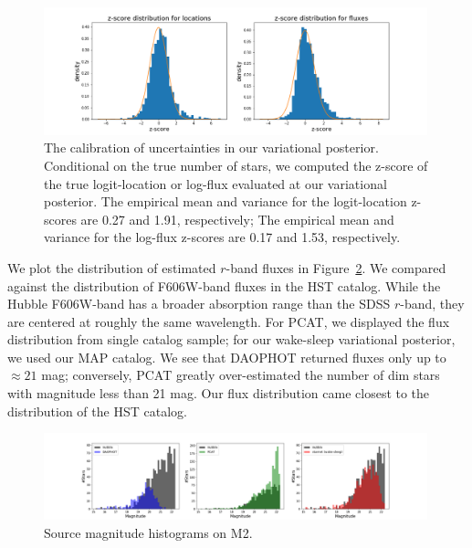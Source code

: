 \begin{figure}[h]
    \centering
    \includegraphics[width=0.99\textwidth]{figures/z-score_calibration.png}
    \caption{The calibration of uncertainties in our variational posterior. Conditional on the true number of stars, we computed the z-score of the true logit-location or log-flux evaluated at our variational posterior. 
    The empirical mean and variance for the logit-location z-scores are 0.27 and 1.91, respectively; The empirical mean and variance for the log-flux z-scores are 0.17 and 1.53, respectively. 
}
    \label{fig:z-score_calibration}
\end{figure}

We plot the distribution of estimated $r$-band fluxes in Figure~\ref{fig:luminosity_fun_m2}. We compared 
against the distribution of F606W-band fluxes in the HST catalog. While the Hubble F606W-band has a broader absorption range than the SDSS $r$-band, they are centered at roughly the same wavelength. For PCAT, we displayed the flux distribution from single catalog sample; for our wake-sleep variational 
posterior, we used our MAP catalog. We see that DAOPHOT returned fluxes only up to $\approx21$ mag; 
conversely, PCAT greatly over-estimated the number of dim stars with magnitude less than 21 mag. Our flux distribution came closest to the distribution of the HST catalog. 

\begin{figure}[h]
    \centering
    \includegraphics[width=0.99\textwidth]{figures/luminosity_fun.png}
    \caption{Source magnitude histograms on M2. }
    \label{fig:luminosity_fun_m2}
\end{figure}

